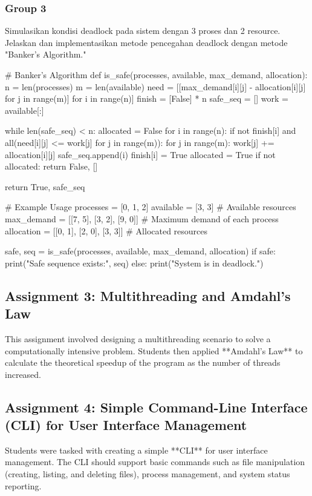 \documentclass[12pt]{article}
\begin{document}
\subsubsection{Group 3}
Simulasikan kondisi deadlock pada sistem dengan 3 proses dan 2 resource. Jelaskan dan implementasikan metode pencegahan deadlock dengan metode "Banker’s Algorithm."

\begin{python}
    # Banker's Algorithm
def is_safe(processes, available, max_demand, allocation):
    n = len(processes)
    m = len(available)
    need = [[max_demand[i][j] - allocation[i][j] for j in range(m)] for i in range(n)]
    finish = [False] * n
    safe_seq = []
    work = available[:]
    
    while len(safe_seq) < n:
        allocated = False
        for i in range(n):
            if not finish[i] and all(need[i][j] <= work[j] for j in range(m)):
                for j in range(m):
                    work[j] += allocation[i][j]
                safe_seq.append(i)
                finish[i] = True
                allocated = True
        if not allocated:
            return False, []
    
    return True, safe_seq

# Example Usage
processes = [0, 1, 2]
available = [3, 3]  # Available resources
max_demand = [[7, 5], [3, 2], [9, 0]]  # Maximum demand of each process
allocation = [[0, 1], [2, 0], [3, 3]]  # Allocated resources

safe, seq = is_safe(processes, available, max_demand, allocation)
if safe:
    print("Safe sequence exists:", seq)
else:
    print("System is in deadlock.")

\end{python}

\subsection{Assignment 3: Multithreading and Amdahl's Law}
This assignment involved designing a multithreading scenario to solve a computationally intensive problem. Students then applied **Amdahl's Law** to calculate the theoretical speedup of the program as the number of threads increased.

\subsection{Assignment 4: Simple Command-Line Interface (CLI) for User Interface Management}
Students were tasked with creating a simple **CLI** for user interface management. The CLI should support basic commands such as file manipulation (creating, listing, and deleting files), process management, and system status reporting.
\end{document}
